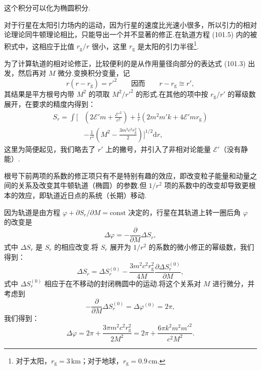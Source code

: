 这个积分可以化为椭圆积分.

对于行星在太阳引力场内的运动，因为行星的速度比光速小很多，所以引力的相对论理论同牛顿理论相比，只能导出一个并不显著的修正.在轨道方程 (101.5) 内的被积式中，这相应于比值 $r_{\mathrm{g}}/r$ 很小，这里 $r_{\mathrm{g}}$ 是太阳的引力半径\footnote{对于太阳，$r_{\mathrm{g}}=3\,\mathrm{km}$；对于地球，$r_{\mathrm{g}}=0.9\,\mathrm{cm}$.}.

为了计算轨道的相对论修正，比较便利的是从作用量径向部分的表达式 (101.3) 出发，然后再对 $M$ 微分.变换积分变量，记
\begin{equation*}
  r(r-r_{\mathrm{g}})=r'^{2}
  \qquad\text{因而}\qquad
  r-r_{\mathrm{g}}\cong r',
\end{equation*}
其结果是平方根号内带 $M^{2}$ 的项取 $M^{2}/r'^{2}$ 的形式.在其他的项中按 $r_{\mathrm{g}}/r'$ 的幂级数展开，在要求的精度内得到：
\begin{equation}
\begin{aligned}
  S_r=\int\Biggl[&\left(2\mathcal{E}'m+\frac{\mathcal{E}'^{2}}{c^{2}}\right)
  +\frac{1}{r}(2m^{2}m'k+4\mathcal{E}'mr_{\mathrm{g}})\\
  &-\frac{1}{r^{2}}\left(M^{2}
  -\frac{3m^{2}c^{2}r_{\mathrm{g}}^{2}}{2}\right)\Biggr]^{1/2}\mathrm{d}r,
\end{aligned}
\end{equation}
这里为简便起见，我们略去了 $r'$ 上的撇号，并引入了非相对论能量 $\mathcal{E}'$（没有静能）.

根号下前两项的系数的修正项只有不是特别有趣的效应，即改变粒子能量和动量之间的关系及改变其牛顿轨道（椭圆）的参数.但 $1/r^{2}$ 项的系数中的改变却导致更根本的效应，即轨道近日点的系统（长期）移动.

因为轨道是由方程 $\varphi+\partial S_r/\partial M=\mathrm{const}$ 决定的，行星在其轨道上转一圈后角 $\varphi$ 的改变是
\begin{equation*}
  \Delta\varphi=-\frac{\partial}{\partial M}\Delta S_r,
\end{equation*}
式中 $\Delta S_r$ 是 $S_r$ 的相应改变.将 $S_r$ 展开为 $1/r^{2}$ 的系数的微小修正的幂级数，我们得到：
\begin{equation*}
  \Delta S_r=\Delta S_r^{(0)}
  -\frac{3m^{2}c^{2}r_{\mathrm{g}}^{2}}{4M}
  \frac{\partial\Delta S_r^{(0)}}{\partial M},
\end{equation*}
式中 $\Delta S_r^{(0)}$ 相应于在不移动的封闭椭圆中的运动.将这个关系对 $M$ 进行微分，并考虑到
\begin{equation*}
  -\frac{\partial}{\partial M}\Delta S_r^{(0)}=\Delta\varphi^{(0)}=2\pi,
\end{equation*}
我们得到：
\begin{equation*}
  \Delta\varphi=2\pi+\frac{3\pi m^{2}c^{2}r_{\mathrm{g}}^{2}}{2M^{2}}
  =2\pi+\frac{6\pi k^{2}m^{2}m'^{2}}{c^{2}M^{2}}.
\end{equation*}

